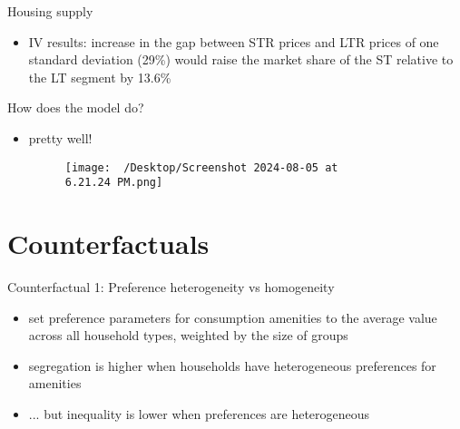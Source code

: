 \begin{frame}{Housing supply}
    \begin{itemize}
        \item IV results: increase in the gap between STR prices and LTR prices of one standard deviation (29\%) would raise the market share of the ST relative to the LT segment by 13.6\%
        \begin{figure}
            \centering
            \caption{}
            \label{fig:photo}
        \end{figure}
    \end{itemize}
\end{frame}

\begin{frame}{How does the model do?}
    \begin{itemize}
        \item pretty well!
        \begin{figure}
            \centering
            \texttt{[image: ~/Desktop/Screenshot 2024-08-05 at 6.21.24 PM.png]}
            \caption{}
            \label{fig:photo}
        \end{figure}
    \end{itemize}
\end{frame}

\section{Counterfactuals}
\begin{frame}{Counterfactual 1: Preference heterogeneity vs homogeneity}
	\begin{itemize}
		\item set preference parameters for consumption amenities to the average value across all household types, weighted by the size of groups
        \item segregation is higher when households have heterogeneous preferences for amenities
        \begin{figure}
            \centering
            \caption{}
            \label{fig:photo}
        \end{figure}
        \item ... but inequality is lower when preferences are heterogeneous
	\end{itemize}
\end{frame}

